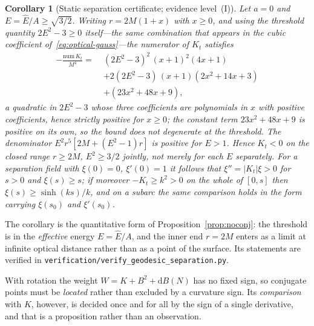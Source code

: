 \documentclass[12pt]{iopart}
\theoremstyle{plain}
\newtheorem{corollary}[proposition]{Corollary}
\theoremstyle{definition}
\theoremstyle{remark}
\newcommand{\Ehat}{\hat E}
\newcommand{\dd}{\mathrm{d}}
\begin{document}
\begin{corollary}[Static separation certificate; evidence level~(I)]
\label{cor:static-separation}
Let $a=0$ and $E=\Ehat/A\ge\sqrt{3/2}$. Writing $r=2M(1+x)$ with $x\ge0$, and
using the threshold quantity $2E^2-3\ge0$ itself---the same combination that
appears in the cubic coefficient of~\eqref{eq:optical-gauss}---the numerator of
$K_t$ satisfies
\begin{equation}
\begin{split}
    -\frac{\mathrm{num}\,K_t}{M^4}=\;&
      (2E^2-3)^2\,(x+1)^2(4x+1)\\
      &+2(2E^2-3)\,(x+1)(2x^2+14x+3)\\
      &+(23x^2+48x+9) ,
\end{split}
    \label{eq:K-certificate}
\end{equation}
a quadratic in $2E^2-3$ whose three coefficients are polynomials in $x$ with
positive coefficients, hence strictly positive for $x\ge0$; the constant term
$23x^2+48x+9$ is positive on its own, so the bound does not degenerate at the
threshold. The denominator
$E^2r^5[2M+(E^2-1)r]$ is positive for $E>1$. Hence $K_t<0$ on the closed range
$r\ge2M$, $E^2\ge3/2$ \emph{jointly}, not merely for each $E$ separately. For a
separation field with $\xi(0)=0$, $\xi'(0)=1$ it follows that $\xi''=|K_t|\xi>0$ for $s>0$
and $\xi(s)\ge s$; if moreover $-K_t\ge k^2>0$ on the whole of $[0,s]$ then
$\xi(s)\ge\sinh(ks)/k$, and on a subarc the same comparison holds in the form
carrying $\xi(s_0)$ and $\xi'(s_0)$.
\end{corollary}

The corollary is the quantitative form of Proposition~\ref{prop:noconj}: the
threshold is in the \emph{effective} energy $E=\Ehat/A$, and the inner end
$r=2M$ enters as a limit at infinite optical distance rather than as a point of
the surface. Its statements are verified in
\texttt{verification/verify\_geodesic\_separation.py}.

With rotation the weight $W=K+B^2+\dd B(N)$ has no fixed sign, so conjugate
points must be \emph{located} rather than excluded by a curvature sign. Its
\emph{comparison} with $K$, however, is decided once and for all by the sign of a
single derivative, and that is a proposition rather than an observation.
\end{document}
